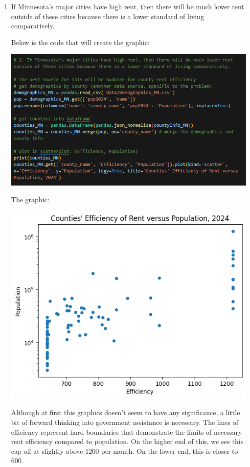 \documentclass[a4paper]{article}
\begin{document}
\begin{enumerate}
\begin{enumerate}
    \item If Minnesota's major cities have high rent, then there will be much lower rent outside of these cities because there is a lower standard of living comparatively. 
    
    Below is the code that will create the graphic: 

    \includegraphics[scale=0.75]{Marcus-Hypothesis-2-code.png}

    The graphic:

    \includegraphics[scale=0.9]{Marcus-Hypothesis-2.png}

    Although at first this graphics doesn't seem to have any significance, a little bit of forward thinking into government assistance is necessary. The lines of efficiency represent hard boundaries that demonstrate the limits of necessary rent efficiency compared to population. On the higher end of this, we see this cap off at slightly above 1200 per month. On the lower end, this is closer to 600. 
    

\end{enumerate}
\end{enumerate}
\end{document}
